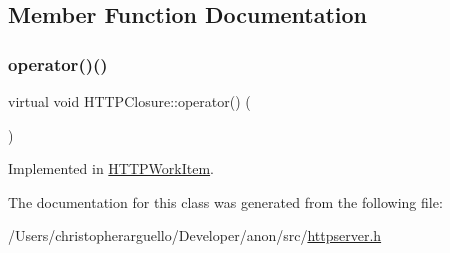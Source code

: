 \subsection{Member Function Documentation}
\mbox{\label{class_h_t_t_p_closure_abbce5d429a7fe2b593919550e50bc225}} 
\subsubsection{\texorpdfstring{operator()()}{operator()()}}
{\footnotesize\ttfamily virtual void H\+T\+T\+P\+Closure\+::operator() (\begin{DoxyParamCaption}{ }\end{DoxyParamCaption})\hspace{0.3cm}{\ttfamily [pure virtual]}}



Implemented in \mbox{\hyperlink{class_h_t_t_p_work_item_a85addf7a6b8fdbf0a63becc7e1f0135e}{H\+T\+T\+P\+Work\+Item}}.



The documentation for this class was generated from the following file\+:\begin{DoxyCompactItemize}
\item 
/\+Users/christopherarguello/\+Developer/anon/src/\mbox{\hyperlink{httpserver_8h}{httpserver.\+h}}\end{DoxyCompactItemize}
